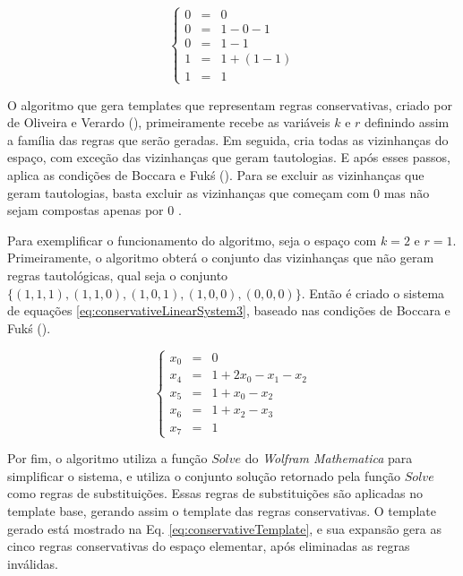 \begin{equation}
\left\{\begin{matrix}
 0 & = & 0 \\ 
 0 & = & 1 - 0 - 1 \\ 
 0 & = & 1 - 1 \\ 
 1 & = & 1 + (1 - 1)\\ 
 1 & = & 1 
\end{matrix}\right.
\label{eq:conservativeAC204}
\end{equation}

O algoritmo que gera templates que representam regras conservativas, criado por de Oliveira e Verardo (\citeyear{deOliveira2014}), primeiramente recebe as variáveis $k$ e $r$ definindo assim a família das regras que serão geradas. Em seguida, cria todas as vizinhanças do espaço, com exceção das vizinhanças que geram tautologias. E após esses passos, aplica as condições de Boccara e Fukś (\citeyear{boccara2002}). Para se excluir as vizinhanças que geram tautologias, basta excluir as vizinhanças que começam com 0 mas não sejam compostas apenas por 0 \cite{Schranko2010}.

Para exemplificar o funcionamento do algoritmo, seja o espaço com $k=2$ e $r=1$. Primeiramente, o algoritmo obterá o conjunto das vizinhanças que não geram regras tautológicas, qual seja o conjunto $\{(1,1,1),(1,1,0),(1,0,1),(1,0,0),(0,0,0)\}$. Então é criado o sistema de equações \eqref{eq:conservativeLinearSystem3}, baseado nas condições de Boccara e Fukś (\citeyear{boccara2002}).

\begin{equation}
\left\{\begin{matrix}
 x_0 & = & 0\\ 
 x_4 & = & 1 +2x_0 -x_1 -x_2\\ 
 x_5 & = & 1 +x_0 -x_2\\
 x_6 & = & 1 +x_2 -x_3\\ 
 x_7 & = & 1
\end{matrix}\right.
\label{eq:conservativeLinearSystem3}
\end{equation}

Por fim, o algoritmo utiliza a função $Solve$ do \textit{Wolfram Mathematica} para simplificar o sistema, e utiliza o conjunto solução retornado pela função $Solve$ como regras de substituições. Essas regras de substituições são aplicadas no template base, gerando assim o template das regras conservativas. O template gerado está mostrado na Eq. \eqref{eq:conservativeTemplate}, e sua expansão gera as cinco regras conservativas do espaço elementar, após eliminadas as regras inválidas.

